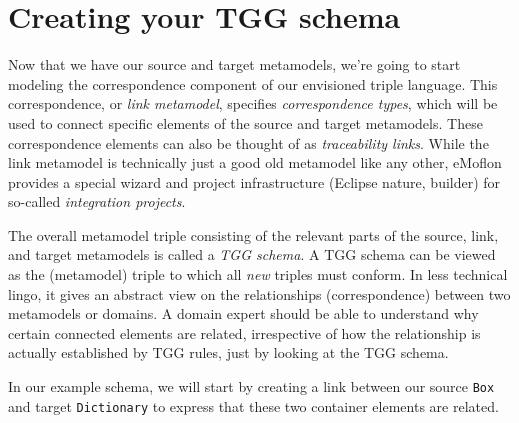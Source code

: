 \newpage
\hypertarget{TGGSchema}{}
\section{Creating your TGG schema}
\genHeader

Now that we have our source and target metamodels, we're going to start modeling the correspondence component of our envisioned triple language. 
This correspondence, or \emph{link metamodel}, specifies \emph{correspondence types}, which will be used to connect specific elements of the source and target metamodels. 
These correspondence elements can also be thought of as \emph{traceability links}.
%
While the link metamodel is technically just a good old metamodel like any other, eMoflon provides a special wizard and project infrastructure (Eclipse nature, builder) for so-called \emph{integration projects}. 

The overall metamodel triple consisting of the relevant parts of the source, link, and target metamodels is called a \emph{TGG schema}.
%
A TGG schema can be viewed as the (metamodel) triple to which all \emph{new} triples must conform. 
In less technical lingo, it gives an abstract view on the relationships (correspondence) between two metamodels or domains. 
A domain expert should be able to understand why certain connected elements are related, irrespective of how the relationship is actually established by TGG rules, just by looking at the TGG schema. 

In our example schema, we will start by creating a link between our source \texttt{Box} and target \texttt{Dictionary} to express that these two container elements are related.

